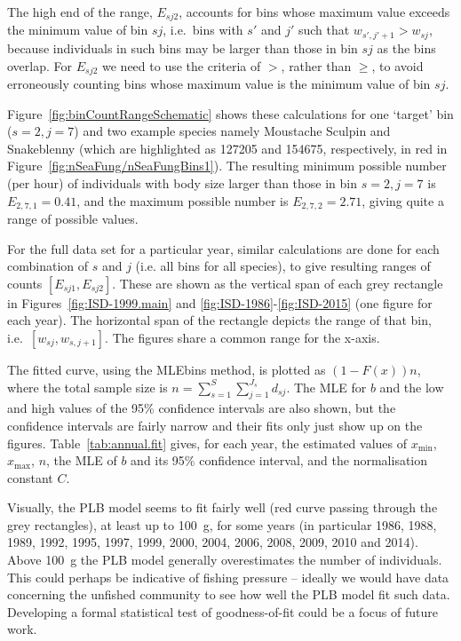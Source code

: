 \documentclass[12pt, letter]{article}
\newcommand{\xmin}{x_{\mathrm{min}}}
\newcommand{\xmax}{x_{\mathrm{max}}}
\begin{document}
%
The high end of the range, $E_{sj2}$, accounts for bins whose maximum value
exceeds the minimum value of bin $sj$, i.e.~bins with $s'$ and $j'$ such that
$w_{s',j'+1} > w_{sj}$, because individuals in such bins may be larger
than those in bin $sj$ as the bins overlap.
For $E_{sj2}$ we need to use the criteria of $>$, rather than $\geq$,
to avoid erroneously counting bins whose maximum value is the minimum value
of bin $sj$.

Figure~\ref{fig:binCountRangeSchematic} shows these calculations for
one `target' bin ($s=2, j=7$) and two
example species namely Moustache Sculpin and Snakeblenny (which are highlighted
as 127205 and 154675, respectively, in red in
Figure~\ref{fig:nSeaFung/nSeaFungBins1}). The resulting
minimum possible number (per hour) of individuals with body size larger than
those in bin $s=2, j=7$ is $E_{2,7,1} = 0.41$, and the maximum possible number
is $E_{2,7,2} = 2.71$, giving quite a range of possible values.

For the full data set for a particular year, similar calculations are done
for each combination of $s$ and $j$ (i.e. all bins for all species),
to give resulting ranges of counts $[E_{sj1}, E_{sj2}]$.
These are shown as the vertical span of each grey rectangle in
Figures~\ref{fig:ISD-1999.main} and \ref{fig:ISD-1986}-\ref{fig:ISD-2015} (one
figure for each year).
The horizontal span of the rectangle
depicts the range of that bin, i.e.~$[w_{sj}, w_{s,j+1}]$. The figures share a
common range for the x-axis.

The fitted curve, using the MLEbins method, is plotted as $(1 - F(x))n$, where
the total sample size is $n = \sum_{s=1}^S \sum_{j=1}^{J_s} d_{sj}$. The MLE for $b$
and the low and high values of the 95\% confidence intervals are also shown, but
the confidence intervals are fairly narrow and their
fits only just show up on the figures. Table~\ref{tab:annual.fit} gives,
for each year, the
estimated values of $\xmin$, $\xmax$, $n$, the MLE of $b$ and its 95\%
confidence interval, and the normalisation constant $C$.


Visually, the PLB model seems to fit fairly well (red curve passing through the
grey rectangles), at least
up to 100~g, for some years (in particular 1986, 1988, 1989, 1992, 1995,
1997, 1999, 2000, 2004, 2006, 2008, 2009, 2010 and 2014). Above 100~g the PLB
model generally overestimates the number of individuals. This could perhaps
be indicative of fishing pressure -- ideally we would have data concerning the
unfished community to see how well the PLB model fit such data. Developing a formal
statistical test of goodness-of-fit could be a focus of future work.
\end{document}
